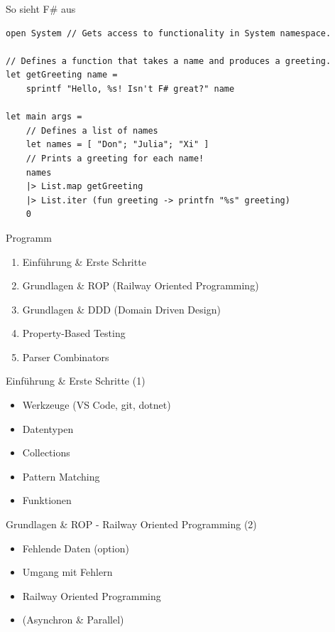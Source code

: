 \documentclass[t]{beamer}
\begin{document}
\begin{frame}[label={sec:org85d5547},fragile]{So sieht F\# aus}
 \begin{verbatim}
open System // Gets access to functionality in System namespace.

// Defines a function that takes a name and produces a greeting.
let getGreeting name =
    sprintf "Hello, %s! Isn't F# great?" name

let main args =
    // Defines a list of names
    let names = [ "Don"; "Julia"; "Xi" ]
    // Prints a greeting for each name!
    names
    |> List.map getGreeting
    |> List.iter (fun greeting -> printfn "%s" greeting)
    0
\end{verbatim}
\end{frame}

\begin{frame}[label={sec:orgb9d1ab7}]{Programm}
\begin{enumerate}
\item Einführung \& Erste Schritte
\item Grundlagen \& ROP (Railway Oriented Programming)
\item Grundlagen \& DDD (Domain Driven Design)
\item Property-Based Testing
\item Parser Combinators
\end{enumerate}
\end{frame}

\begin{frame}[label={sec:org05f94ee}]{Einführung \& Erste Schritte (1)}
\begin{itemize}
\item Werkzeuge (VS Code, git, dotnet)
\item Datentypen
\item Collections
\item Pattern Matching
\item Funktionen
\end{itemize}
\end{frame}

\begin{frame}[label={sec:org09450d3}]{Grundlagen \& ROP - Railway Oriented Programming (2)}
\begin{itemize}
\item Fehlende Daten (option)
\item Umgang mit Fehlern
\item Railway Oriented Programming
\item (Asynchron \& Parallel)
\end{itemize}
\end{frame}
\end{document}
